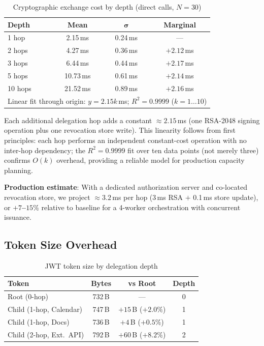 \documentclass[journal]{IEEEtran}
\begin{document}
\begin{table}[h]
\caption{Cryptographic exchange cost by depth (direct calls, $N=30$)}
\label{tab:hopcosts}
\centering
\footnotesize
\begin{tabular}{lccc}
\toprule
\textbf{Depth} & \textbf{Mean} & $\boldsymbol\sigma$ & \textbf{Marginal} \\
\midrule
1 hop  &  2.15\,ms & 0.24\,ms & ---        \\
2 hops &  4.27\,ms & 0.36\,ms & $+2.12$\,ms \\
3 hops &  6.44\,ms & 0.44\,ms & $+2.17$\,ms \\
5 hops & 10.73\,ms & 0.61\,ms & $+2.14$\,ms \\
10 hops & 21.52\,ms & 0.89\,ms & $+2.16$\,ms \\
\midrule
\multicolumn{4}{l}{\scriptsize
  Linear fit through origin: $y = 2.15k$\,ms;\; $R^2 = 0.9999$ ($k=1\ldots10$)}
\end{tabular}
\end{table}

Each additional delegation hop adds a constant $\approx 2.15$\,ms (one RSA-2048
signing operation plus one revocation store write). This linearity follows from
first principles: each hop performs an independent constant-cost operation with no
inter-hop dependency; the $R^2 = 0.9999$ fit over ten data points (not merely
three) confirms $O(k)$ overhead, providing a reliable model for production
capacity planning.

\textbf{Production estimate}: With a dedicated authorization server and
co-located revocation store, we project $\approx 3.2$\,ms per hop (3\,ms RSA
$+$ 0.1\,ms store update), or \textbf{$+7$--$15\%$} relative to baseline for
a 4-worker orchestration with concurrent issuance.

\subsection{Token Size Overhead}

\begin{table}[h]
\caption{JWT token size by delegation depth}
\label{tab:tokensizes}
\centering
\footnotesize
\begin{tabular}{lccc}
\toprule
\textbf{Token} & \textbf{Bytes} & \textbf{vs Root} & \textbf{Depth} \\
\midrule
Root (0-hop)             & 732\,B & ---                    & 0 \\
Child (1-hop, Calendar)  & 747\,B & $+15$\,B ($+2.0\%$)   & 1 \\
Child (1-hop, Docs)      & 736\,B & $+4$\,B ($+0.5\%$)    & 1 \\
Child (2-hop, Ext.\ API) & 792\,B & $+60$\,B ($+8.2\%$)   & 2 \\
\bottomrule
\end{tabular}
\end{table}
\end{document}
